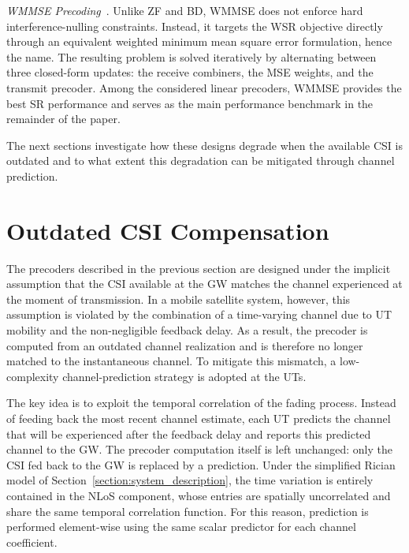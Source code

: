 \documentclass[conference]{IEEEtran}
\begin{document}
\textit{WMMSE Precoding}~\cite{WMMSE}.
Unlike \ac{ZF} and \ac{BD}, \ac{WMMSE} does not enforce hard interference-nulling constraints.
Instead, it targets the \ac{WSR} objective directly through an equivalent weighted minimum mean square error formulation, hence the name.
The resulting problem is solved iteratively by alternating between three closed-form updates: the receive combiners, the \acs{MSE} weights, and the transmit precoder.
Among the considered linear precoders, \ac{WMMSE} provides the best \ac{SR} performance and serves as the main performance benchmark in the remainder of the paper.

The next sections investigate how these designs degrade when the available \ac{CSI} is outdated and to what extent this degradation can be mitigated through channel prediction.

\section{Outdated CSI Compensation}
\label{section:outdated_csi_compensation}

The precoders described in the previous section are designed under the implicit assumption that the \ac{CSI} available at the \ac{GW} matches the channel experienced at the moment of transmission.
In a mobile satellite system, however, this assumption is violated by the combination of a time-varying channel due to \ac{UT} mobility and the non-negligible feedback delay.
As a result, the precoder is computed from an outdated channel realization and is therefore no longer matched to the instantaneous channel. 
To mitigate this mismatch, a low-complexity channel-prediction strategy is adopted at the \acp{UT}.

The key idea is to exploit the temporal correlation of the fading process.
Instead of feeding back the most recent channel estimate, each \ac{UT} predicts the channel that will be experienced after the feedback delay and reports this predicted channel to the \ac{GW}.
The precoder computation itself is left unchanged: only the \ac{CSI} fed back to the \ac{GW} is replaced by a prediction.
Under the simplified Rician model of Section~\ref{section:system_description}, the time variation is entirely contained in the \ac{NLoS} component, whose entries are spatially uncorrelated and share the same temporal correlation function.
For this reason, prediction is performed element-wise using the same scalar predictor for each channel coefficient.
\end{document}
